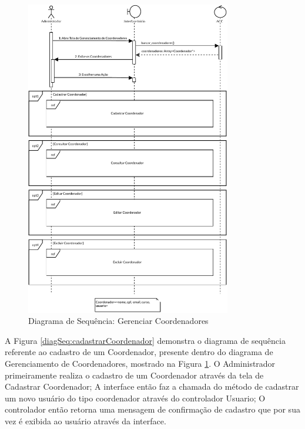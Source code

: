 \begin{figure}[H]
    \centering
    \includegraphics[width=0.8\textwidth]{dados/figuras/Proposta/DiagramasDeSequencia/Gerenciar Coodenadores-Completo}
    \caption{Diagrama de Sequência: Gerenciar Coordenadores}
    \label{diagSeq:gerenciarCoordenadores}
\end{figure}

A Figura \ref{diagSeq:cadastrarCoordenador} demonstra o diagrama de sequência referente ao cadastro de um Coordenador, presente dentro do diagrama de Gerenciamento de Coordenadores, mostrado na Figura \ref{diagSeq:gerenciarCoordenadores}. O Administrador primeiramente realiza o cadastro de um Coordenador através da tela de Cadastrar Coordenador; A interface então faz a chamada do método de cadastrar um novo usuário do tipo coordenador através do controlador Usuario; O controlador então retorna uma mensagem de confirmação de cadastro que por sua vez é exibida ao usuário através da interface.

